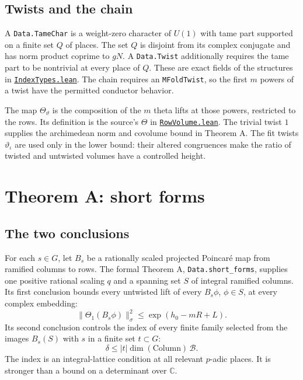 \documentclass[11pt,oneside,openany]{amsbook}
\theoremstyle{remark}
\numberwithin{equation}{section}
\newcommand{\C}{\mathbb C}
\newcommand{\ghroot}{https://github.com/lsernau/grh-lean/blob/}
\newcommand{\ghrev}{72fead102f663d5c7a407964a13dc0cf9d977207}
\newcommand{\leanfile}[2]{%
  \href{\ghroot\ghrev/grh-compact/src/#1}{\nolinkurl{#2}}}
\begin{document}
\section{Twists and the chain}
\label{sec:twist-data}
A \texttt{Data.TameChar} is a weight-zero character
of $U(1)$ with tame part supported on a finite set
$Q$ of places. The set $Q$ is disjoint from its
complex conjugate and has norm product coprime to
$gN$. A \texttt{Data.Twist} additionally requires
the tame part to be nontrivial at every place of $Q$.
These are exact fields of the structures in
\leanfile{New/Seesaw/IndexTypes.lean}%
{IndexTypes.lean}. The chain requires an
\texttt{MFoldTwist}, so the first $m$ powers of a twist
have the permitted conductor behavior.

The map $\Theta_\vartheta$ is the composition of the
$m$ theta lifts at those powers, restricted to the
rows. Its definition is the source's $\Theta$ in
\leanfile{New/Rows/RowVolume.lean}{RowVolume.lean}.
The trivial twist $1$ supplies the archimedean norm
and covolume bound in Theorem A. The fit twists
$\vartheta_\iota$ are used only in the lower bound:
their altered congruences make the ratio of twisted
and untwisted volumes have a controlled height.

\chapter{Theorem A: short forms}
\label{ch:short}
\section{The two conclusions}
For each $s\in G$, let $B_s$ be a rationally scaled projected
Poincar\'e map from ramified columns to rows. The formal
Theorem A, \texttt{Data.short\_forms}, supplies one positive
rational scaling $q$ and a spanning set $S$ of integral
ramified columns. Its first conclusion bounds every untwisted
lift of every $B_s\phi$, $\phi\in S$, at every complex embedding:
\begin{equation}
\label{eq:short-bound}
\|\Theta_1(B_s\phi)\|_\sigma^2
\le\exp(h_0-mR+L).
\end{equation}
Its second conclusion controls the index of every finite
family selected from the images $B_s(S)$ with $s$ in a finite
set $t\subset G$:
\begin{equation}
\label{eq:a-index}
\delta\le |t|\dim(\mathrm{Column})\,\mathcal B.
\end{equation}
The index is an integral-lattice condition at all relevant
$p$-adic places. It is stronger than a bound on a determinant
over $\C$.
\end{document}
